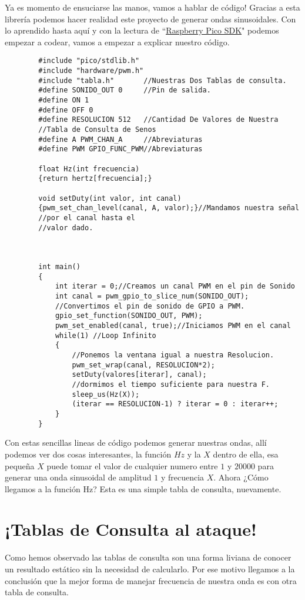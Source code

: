 \documentclass[]{article}
\begin{document}
	Ya es momento de ensuciarse las manos, vamos a hablar de código! Gracias a esta librería podemos hacer realidad este proyecto de generar ondas sinusoidales. Con lo aprendido hasta aquí y con la lectura de ``\href{https://datasheets.raspberrypi.com/pico/raspberry-pi-pico-c-sdk.pdf}{\underline{Raspberry Pico SDK}}" podemos empezar a codear, vamos a empezar a explicar nuestro código.\\
	\begin{verbatim}
		#include "pico/stdlib.h"
		#include "hardware/pwm.h"
		#include "tabla.h"       //Nuestras Dos Tablas de consulta.
		#define SONIDO_OUT 0     //Pin de salida.
		#define ON 1
		#define OFF 0
		#define RESOLUCION 512   //Cantidad De Valores de Nuestra 
		//Tabla de Consulta de Senos
		#define A PWM_CHAN_A     //Abreviaturas
		#define PWM GPIO_FUNC_PWM//Abreviaturas
		
		float Hz(int frecuencia)
		{return hertz[frecuencia];}
		
		void setDuty(int valor, int canal)
		{pwm_set_chan_level(canal, A, valor);}//Mandamos nuestra señal
		//por el canal hasta el 
		//valor dado.
		
		
		
		int main() 
		{                                      
			int iterar = 0;//Creamos un canal PWM en el pin de Sonido
			int canal = pwm_gpio_to_slice_num(SONIDO_OUT);
			//Convertimos el pin de sonido de GPIO a PWM.
			gpio_set_function(SONIDO_OUT, PWM);
			pwm_set_enabled(canal, true);//Iniciamos PWM en el canal      
			while(1) //Loop Infinito
			{
				//Ponemos la ventana igual a nuestra Resolucion.
				pwm_set_wrap(canal, RESOLUCION*2);
				setDuty(valores[iterar], canal);
				//dormimos el tiempo suficiente para nuestra F.
				sleep_us(Hz(X));                
				(iterar == RESOLUCION-1) ? iterar = 0 : iterar++;
			}
		}
	\end{verbatim}
Con estas sencillas lineas de código podemos generar nuestras ondas, allí podemos ver dos cosas interesantes, la función $Hz$ y la $X$ dentro de ella, esa pequeña $X$ puede tomar el valor de cualquier numero entre $1$ y $20000$ para generar una onda sinusoidal de amplitud $1$ y frecuencia $X$. Ahora ¿Cómo llegamos a la función Hz? Esta es una simple tabla de consulta, nuevamente. 
\section*{¡Tablas de Consulta al ataque!}
	Como hemos observado las tablas de consulta son una forma liviana de conocer un resultado estático sin la necesidad de calcularlo. Por ese motivo llegamos a la conclusión que la mejor forma de manejar frecuencia de nuestra onda es con otra tabla de consulta.
\end{document}
